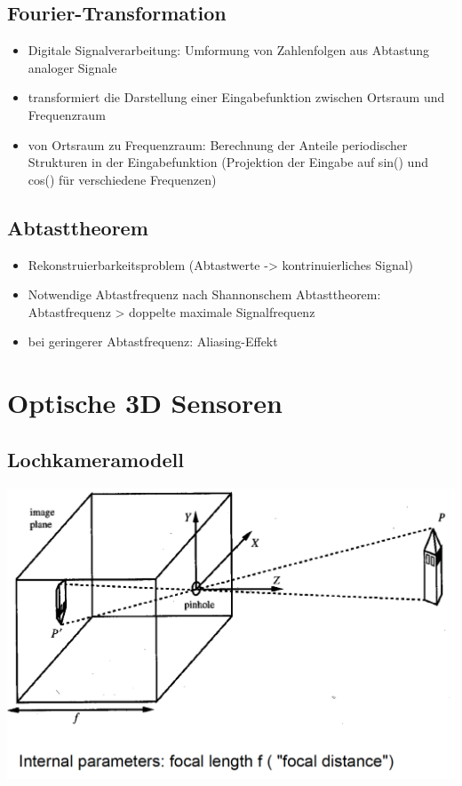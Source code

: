 \documentclass[paper=a4, fontsize=11pt]{scrartcl} %
\numberwithin{equation}{section} %
\numberwithin{figure}{section} %
\numberwithin{table}{section} %
\begin{document}
\subsection{Fourier-Transformation}

\begin{itemize}
\item Digitale Signalverarbeitung: Umformung von Zahlenfolgen aus Abtastung analoger Signale
\item transformiert die Darstellung einer Eingabefunktion zwischen Ortsraum und Frequenzraum
\item von Ortsraum zu Frequenzraum: Berechnung der Anteile periodischer Strukturen in der Eingabefunktion (Projektion der Eingabe auf sin() und cos() für verschiedene Frequenzen)
\end{itemize}

\subsection{Abtasttheorem}

\begin{itemize}
\item Rekonstruierbarkeitsproblem (Abtastwerte -> kontrinuierliches Signal)
\item Notwendige Abtastfrequenz nach Shannonschem Abtasttheorem: Abtastfrequenz > doppelte maximale Signalfrequenz
\item bei geringerer Abtastfrequenz: Aliasing-Effekt
\end{itemize}

\section{Optische 3D Sensoren}

\subsection{Lochkameramodell}

\includegraphics[width=\textwidth]{imgs/lochkamera}
\end{document}
